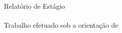 \begin{titlepage}
\color{PANTONECoolGray7C}
\thelogo
\leading{20.4pt}
{\Large
\theauthor
\\
%
\\
\textbf{\thetitleA}
\\
\textbf{\thetitleB}
\\
\textbf{\thetitleC}
}

\vspace*{\fill}
{\footnotesize \myear}
\end{titlepage}

\null
\thispagestyle{empty}
\pagecolor{PANTONECoolGray7C}
\afterpage{\nopagecolor}
\newpage

\begin{titlepage}
\color{PANTONECoolGray7C}
\thelogoB
\leading{20.4pt}
{\Large
\theauthor
\\
%
\\
\textbf{\thetitleA}
\\
\textbf{\thetitleB}
\\
\textbf{\thetitleC}
}

\vspace{55.2mm}
\leading{16.8pt}
{\large
Relatório de Estágio
\\
\themasters
\\
\thearea
Trabalho efetuado sob a orientação de
\\
\textbf{\thesupervisor}
\\
\thecosupervisor}

\vspace*{\fill}
{\footnotesize \myear}
\end{titlepage}